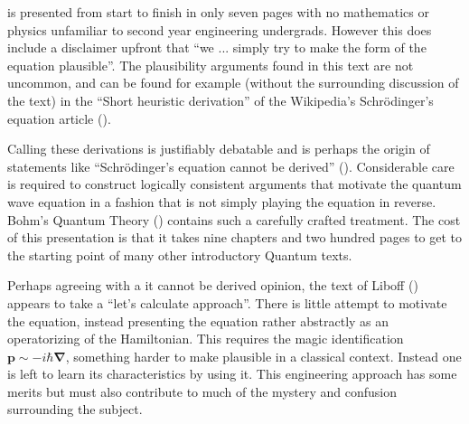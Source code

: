 \documentclass[]{eliblog}
\newcommand{\Bp}[0]{\mathbf{p}}
\newcommand{\spacegrad}[0]{\boldsymbol{\nabla}}
\begin{document}
is presented from start to finish in only seven pages with no mathematics or physics unfamiliar to second year engineering undergrads.  However this does include a disclaimer upfront that ``we ... simply try to make the form of the equation plausible''.  The plausibility arguments found in this text are not uncommon, and can be found for example (without the surrounding discussion of the text) in the ``Short heuristic derivation'' of the Wikipedia's Schr\"{o}dinger's equation article (\cite{wikiSchH}).

Calling these derivations is justifiably debatable and is perhaps the origin of statements like ``Schr\"{o}dinger's equation cannot be derived'' (\cite{hyperphysicsSch}).
Considerable care is required to construct logically consistent arguments that motivate the quantum wave equation in a fashion that is not simply playing the equation in reverse.  Bohm's Quantum Theory (\cite{bohm1989qt}) contains such a carefully crafted treatment.  The cost of this presentation is that it takes nine chapters and two hundred pages to get to the starting point of many other introductory Quantum texts.

Perhaps agreeing with a it cannot be derived opinion, the text of Liboff (\cite{liboff2003iqm}) appears to take a ``let's calculate approach''.  There is little attempt to motivate the equation, instead presenting the equation rather abstractly as an operatorizing of the Hamiltonian.  This requires the magic identification $\Bp \sim -i \hbar \spacegrad$, something harder to make plausible in a classical context.
Instead one is left to learn its characteristics by using it.  This engineering approach has some merits but must also contribute to much of the mystery and confusion surrounding the subject.



\end{document}
